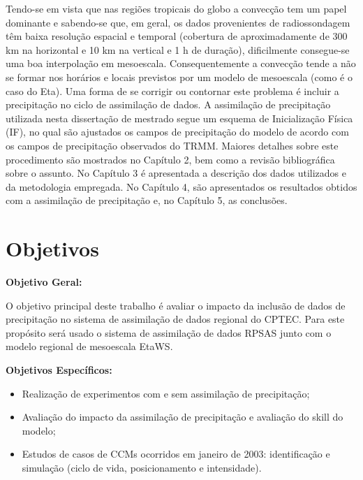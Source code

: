 Tendo-se em vista que nas regiões tropicais do globo a convecção tem um papel dominante e sabendo-se que, em geral, os dados provenientes de radiossondagem têm baixa resolução espacial e temporal (cobertura de aproximadamente de 300 km na horizontal e 10 km na vertical e 1 h de duração), dificilmente consegue-se uma boa interpolação em mesoescala. Consequentemente a convecção tende a não se formar nos horários e locais previstos por um modelo de mesoescala (como é o caso do Eta). Uma forma de se corrigir ou contornar este problema é incluir a precipitação no ciclo de assimilação de dados. A assimilação de precipitação utilizada nesta dissertação de mestrado segue um esquema de Inicialização Física (IF), no qual são ajustados os campos de precipitação do modelo de acordo com os campos de precipitação observados do TRMM. Maiores detalhes sobre este procedimento são mostrados no Capítulo 2, bem como a revisão bibliográfica sobre o assunto. No Capítulo 3 é apresentada a descrição dos dados utilizados e da metodologia empregada. No Capítulo 4, são apresentados os resultados obtidos com a assimilação de precipitação e, no Capítulo 5, as conclusões.

\section{Objetivos}
\label{ss:objetivos} 

\textbf{Objetivo Geral:}

O objetivo principal deste trabalho é avaliar o impacto da inclusão de dados de precipitação no sistema de assimilação de dados regional do CPTEC. Para este propósito será usado o sistema de assimilação de dados RPSAS junto com o modelo regional de mesoescala EtaWS.

\textbf{Objetivos Específicos:}

\begin{itemize}
\item Realização de experimentos com e sem assimilação de precipitação;
\item Avaliação do impacto da assimilação de precipitação e avaliação do skill do modelo;
\item Estudos de casos de CCMs ocorridos em janeiro de 2003: identificação e simulação (ciclo de vida, posicionamento e intensidade).
\end{itemize}

